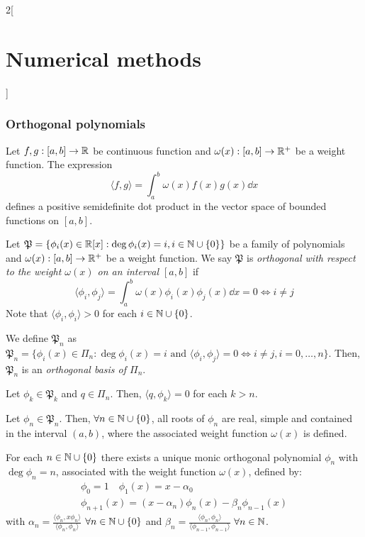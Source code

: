 \documentclass[../../../main.tex]{subfiles}
\begin{document}
\begin{multicols}{2}[\section{Numerical methods}]
  \subsubsection{Orthogonal polynomials}
  \begin{definition}
    Let $f,g:[a,b]\rightarrow\mathbb{R}$ be continuous function and $\omega(x):[a,b]\rightarrow\mathbb{R}^+$ be a weight function. The expression $$\langle f,g\rangle=\int_a^b\omega(x)f(x)g(x)\dd x$$ defines a positive semidefinite dot product in the vector space of bounded functions on $[a,b]$.
  \end{definition}
  \begin{definition}
    Let $\mathfrak{P}=\{\phi_i(x)\in\mathbb{R}[x]:\deg \phi_i(x)=i, i\in\mathbb{N}\cup\{0\}\}$ be a family of polynomials and $\omega(x):[a,b]\rightarrow\mathbb{R}^+$ be a weight function. We say $\mathfrak{P}$ is \textit{orthogonal with respect to the weight $\omega(x)$ on an interval $[a,b]$} if $$\langle \phi_i,\phi_j\rangle=\int_a^b\omega(x)\phi_i(x)\phi_j(x)\dd x=0\iff i\ne j$$
    Note that $\langle \phi_i,\phi_i\rangle>0$ for each $i\in\mathbb{N}\cup\{0\}$.
  \end{definition}
  \begin{lemma}
    We define $\mathfrak{P}_n$ as $\mathfrak{P}_n=\{\phi_i(x)\in\Pi_n:\deg\phi_i(x)=i\text{ and }\langle \phi_i,\phi_j\rangle=0\iff i\ne j,  i=0,\ldots,n\}$. Then, $\mathfrak{P}_n$ is an \textit{orthogonal basis of $\Pi_n$}.
  \end{lemma}
  \begin{lemma}
    Let $\phi_k\in\mathfrak{P}_k$ and $q\in\Pi_n$. Then, $\langle q,\phi_k\rangle=0$ for each $k>n$.
  \end{lemma}
  \begin{lemma}
    Let $\phi_n\in\mathfrak{P}_n$. Then, $\forall n\in\mathbb{N}\cup\{0\}$, all roots of $\phi_n$ are real, simple and contained in the interval $(a,b)$, where the associated weight function $\omega(x)$ is defined.
  \end{lemma}
  \begin{theorem}
    For each $n\in\mathbb{N}\cup\{0\}$ there exists a unique monic orthogonal polynomial $\phi_n$ with $\deg\phi_n=n$, associated with the weight function $\omega(x)$, defined by:
    \begin{gather*}
      \phi_0=1\quad\phi_1(x)=x-\alpha_0\\
      \phi_{n+1}(x)=(x-\alpha_n)\phi_n(x)-\beta_n\phi_{n-1}(x)
    \end{gather*}
    with $\alpha_n=\frac{\langle\phi_n,x\phi_n\rangle}{\langle\phi_n,\phi_n\rangle}$ $\forall n\in\mathbb{N}\cup\{0\}$ and $\beta_n=\frac{\langle\phi_n,\phi_n\rangle}{\langle\phi_{n-1},\phi_{n-1}\rangle}$ $\forall n\in\mathbb{N}$.

\end{theorem}
\end{multicols}
\end{document}

